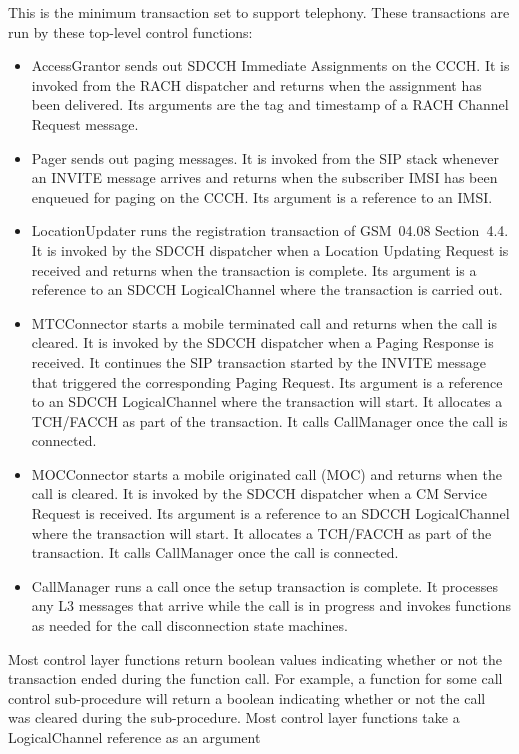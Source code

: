 \documentclass[11pt]{book}
\begin{document}
This is the minimum transaction set to support telephony.  These transactions are run by these top-level control functions:
\begin{itemize}
	\item AccessGrantor sends out SDCCH Immediate Assignments on the CCCH. It is invoked from the RACH dispatcher and returns when the assignment has been delivered.  Its arguments are the tag and timestamp of a RACH Channel Request message.
	\item Pager sends out paging messages. It is invoked from the SIP stack whenever an INVITE message arrives and returns when the subscriber IMSI has been enqueued for paging on the CCCH.  Its argument is a reference to an IMSI.
	\item LocationUpdater runs the registration transaction of GSM~04.08 Section~4.4.  It is invoked by the SDCCH dispatcher when a Location Updating Request is received and returns when the transaction is complete.  Its argument is a reference to an SDCCH LogicalChannel where the transaction is carried out.
	\item MTCConnector starts a mobile terminated call and returns when the call is cleared.  It is invoked by the SDCCH dispatcher when a Paging Response is received.  It continues the SIP transaction started by the INVITE message that triggered the corresponding Paging Request.  Its argument is a reference to an SDCCH LogicalChannel where the transaction will start.  It allocates a TCH/FACCH as part of the transaction.  It calls CallManager once the call is connected.
	\item MOCConnector starts a mobile originated call (MOC) and returns when the call is cleared.  It is invoked by the SDCCH dispatcher when a CM Service Request is received.  Its argument is a reference to an SDCCH LogicalChannel where the transaction will start.  It allocates a TCH/FACCH as part of the transaction.  It calls CallManager once the call is connected.
	\item CallManager runs a call once the setup transaction is complete.  It processes any L3 messages that arrive while the call is in progress and invokes functions as needed for the call disconnection state machines.
\end{itemize}

Most control layer functions return boolean values indicating whether or not the transaction ended during the function call.  For example, a function for some call control sub-procedure will return a boolean indicating whether or not the call was cleared during the sub-procedure.  Most control layer functions take a LogicalChannel reference as an argument
\end{document}
